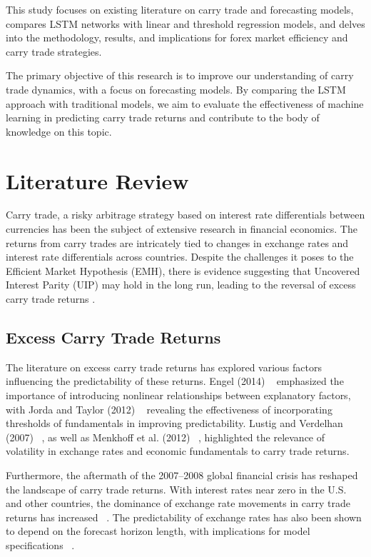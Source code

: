 \documentclass[a4paper,10pt]{article}
\begin{document}
This study focuses on existing literature on carry trade and forecasting models, compares LSTM networks with linear and threshold regression models, and delves into the methodology, results, and implications for forex market efficiency and carry trade strategies.

The primary objective of this research is to improve our understanding of carry trade dynamics, with a focus on forecasting models. By comparing the LSTM approach with traditional models, we aim to evaluate the effectiveness of machine learning in predicting carry trade returns and contribute to the body of knowledge on this topic.

\section{Literature Review}

Carry trade, a risky arbitrage strategy based on interest rate differentials between currencies has been the subject of extensive research in financial economics. The returns from carry trades are intricately tied to changes in exchange rates and interest rate differentials across countries. Despite the challenges it poses to the Efficient Market Hypothesis (EMH), there is evidence suggesting that Uncovered Interest Parity (UIP) may hold in the long run, leading to the reversal of excess carry trade returns \cite{wang2021machine}.

\subsection{Excess Carry Trade Returns}

The literature on excess carry trade returns has explored various factors influencing the predictability of these returns. Engel (2014) ~\cite{engel2014exchange} emphasized the importance of introducing nonlinear relationships between explanatory factors, with Jorda and Taylor (2012) ~\cite{jorda2012carry} revealing the effectiveness of incorporating thresholds of fundamentals in improving predictability. Lustig and Verdelhan (2007) ~\cite{lustig2007cross}, as well as Menkhoff et al. (2012) ~\cite{menkhoff2012carry}, highlighted the relevance of volatility in exchange rates and economic fundamentals to carry trade returns.

Furthermore, the aftermath of the 2007–2008 global financial crisis has reshaped the landscape of carry trade returns. With interest rates near zero in the U.S. and other countries, the dominance of exchange rate movements in carry trade returns has increased ~\cite{rossi2013exchange}. The predictability of exchange rates has also been shown to depend on the forecast horizon length, with implications for model specifications ~\cite{chinn2006partial}.
\end{document}
